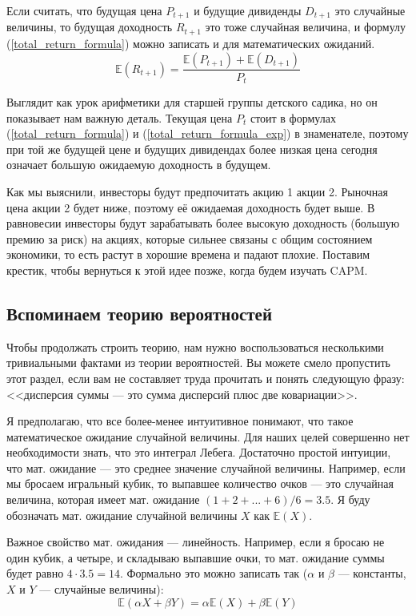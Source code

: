 Если считать, что будущая цена $P_{t+1}$ и будущие дивиденды $D_{t+1}$ это случайные величины, то будущая доходность $R_{t+1}$ это тоже случайная величина, и формулу (\ref{total_return_formula}) можно записать и для математических ожиданий.
\begin{equation}
\mathbb{E}(R_{t+1}) = \dfrac{\mathbb{E}(P_{t+1}) + \mathbb{E}(D_{t+1})}{P_t}
\label{total_return_formula_exp}
\end{equation}

Выглядит как урок арифметики для старшей группы детского садика, но он показывает нам важную деталь. Текущая цена $P_t$ стоит в формулах (\ref{total_return_formula}) и (\ref{total_return_formula_exp}) в знаменателе, поэтому при той же будущей цене и будущих дивидендах более низкая цена сегодня означает большую ожидаемую доходность в будущем.

Как мы выяснили, инвесторы будут предпочитать акцию 1 акции 2. Рыночная цена акции 2 будет ниже, поэтому её ожидаемая доходность будет выше. В равновесии инвесторы будут зарабатывать более высокую доходность (большую премию за риск) на акциях, которые сильнее связаны с общим состоянием экономики, то есть растут в хорошие времена и падают плохие. Поставим крестик, чтобы вернуться к этой идее позже, когда будем изучать CAPM.

\subsection{Вспоминаем теорию вероятностей}

Чтобы продолжать строить теорию, нам нужно воспользоваться несколькими тривиальными фактами из теории вероятностей. Вы можете смело пропустить этот раздел, если вам не составляет труда прочитать и понять следующую фразу: <<дисперсия суммы --- это сумма дисперсий плюс две ковариации>>.

Я предполагаю, что все более-менее интуитивное понимают, что такое математическое ожидание случайной величины. Для наших целей совершенно нет необходимости знать, что это интеграл Лебега. Достаточно простой интуиции, что мат. ожидание --- это среднее значение случайной величины. Например, если мы бросаем игральный кубик, то выпавшее количество очков --- это случайная величина, которая имеет мат. ожидание $(1+2+...+6)/6=3.5$. Я буду обозначать мат. ожидание случайной величины $X$ как $\mathbb{E}(X)$.

Важное свойство мат. ожидания --- линейность. Например, если я бросаю не один кубик, а четыре, и складываю выпавшие очки, то мат. ожидание суммы будет равно $4 \cdot 3.5 =  14$. Формально это можно записать так ($\alpha$ и $\beta$ --- константы, $X$ и $Y$ --- случайные величины):
\begin{equation*}
\mathbb{E}(\alpha X + \beta Y) = \alpha\mathbb{E}(X) + \beta\mathbb{E}(Y)
\end{equation*}

